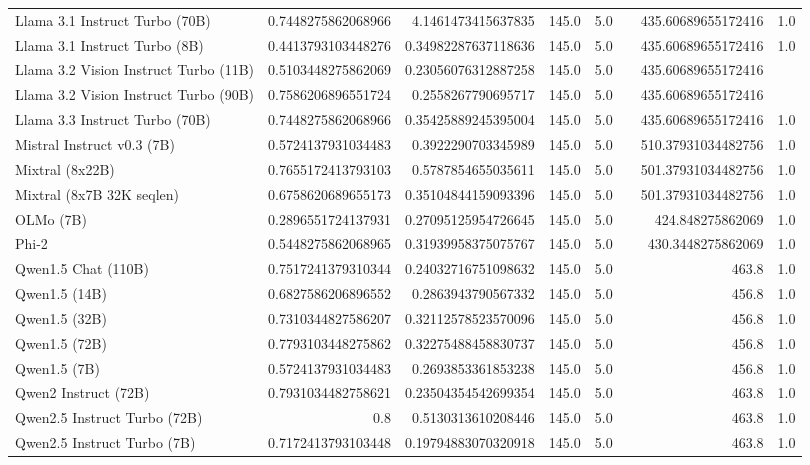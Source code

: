 \begin{table}[htp]
{\begin{tabular}{lrrrrrrr}
Llama 3.1 Instruct Turbo (70B) & 0.7448275862068966 & 4.1461473415637835 & 145.0 & 5.0 &  & 435.60689655172416 & 1.0 \\
Llama 3.1 Instruct Turbo (8B) & 0.4413793103448276 & 0.34982287637118636 & 145.0 & 5.0 &  & 435.60689655172416 & 1.0 \\
Llama 3.2 Vision Instruct Turbo (11B) & 0.5103448275862069 & 0.23056076312887258 & 145.0 & 5.0 &  & 435.60689655172416 &  \\
Llama 3.2 Vision Instruct Turbo (90B) & 0.7586206896551724 & 0.2558267790695717 & 145.0 & 5.0 &  & 435.60689655172416 &  \\
Llama 3.3 Instruct Turbo (70B) & 0.7448275862068966 & 0.35425889245395004 & 145.0 & 5.0 &  & 435.60689655172416 & 1.0 \\
Mistral Instruct v0.3 (7B) & 0.5724137931034483 & 0.3922290703345989 & 145.0 & 5.0 &  & 510.37931034482756 & 1.0 \\
Mixtral (8x22B) & 0.7655172413793103 & 0.5787854655035611 & 145.0 & 5.0 &  & 501.37931034482756 & 1.0 \\
Mixtral (8x7B 32K seqlen) & 0.6758620689655173 & 0.35104844159093396 & 145.0 & 5.0 &  & 501.37931034482756 & 1.0 \\
OLMo (7B) & 0.2896551724137931 & 0.27095125954726645 & 145.0 & 5.0 &  & 424.848275862069 & 1.0 \\
Phi-2 & 0.5448275862068965 & 0.31939958375075767 & 145.0 & 5.0 &  & 430.3448275862069 & 1.0 \\
Qwen1.5 Chat (110B) & 0.7517241379310344 & 0.24032716751098632 & 145.0 & 5.0 &  & 463.8 & 1.0 \\
Qwen1.5 (14B) & 0.6827586206896552 & 0.2863943790567332 & 145.0 & 5.0 &  & 456.8 & 1.0 \\
Qwen1.5 (32B) & 0.7310344827586207 & 0.32112578523570096 & 145.0 & 5.0 &  & 456.8 & 1.0 \\
Qwen1.5 (72B) & 0.7793103448275862 & 0.32275488458830737 & 145.0 & 5.0 &  & 456.8 & 1.0 \\
Qwen1.5 (7B) & 0.5724137931034483 & 0.2693853361853238 & 145.0 & 5.0 &  & 456.8 & 1.0 \\
Qwen2 Instruct (72B) & 0.7931034482758621 & 0.23504354542699354 & 145.0 & 5.0 &  & 463.8 & 1.0 \\
Qwen2.5 Instruct Turbo (72B) & 0.8 & 0.5130313610208446 & 145.0 & 5.0 &  & 463.8 & 1.0 \\
Qwen2.5 Instruct Turbo (7B) & 0.7172413793103448 & 0.19794883070320918 & 145.0 & 5.0 &  & 463.8 & 1.0 \\

\end{tabular}}
\end{table}
